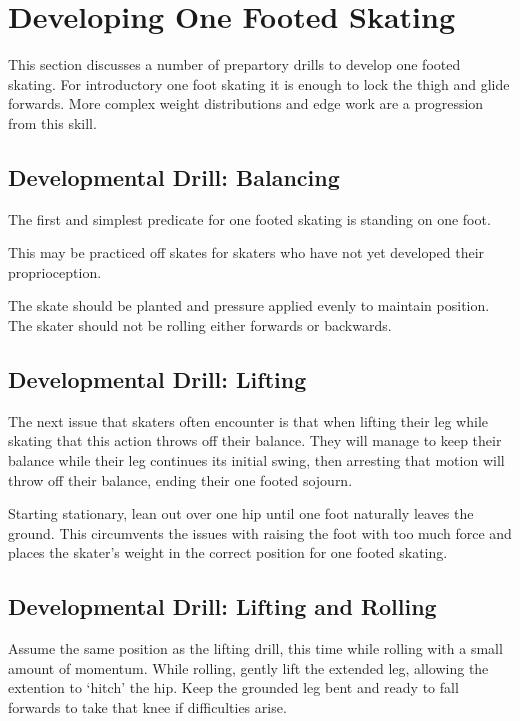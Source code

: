 \section{Developing One Footed Skating}
\label{sec:one_foot/development}


This section discusses a number of prepartory drills to develop one footed skating. 
For introductory one foot skating it is enough to lock the thigh and glide forwards.
More complex weight distributions and edge work are a progression from this skill.     


\subsection*{Developmental Drill: Balancing}
The first and simplest predicate for one footed skating is standing on one foot. 

This may be practiced off skates for skaters who have not yet developed their proprioception.    

The skate should be planted and pressure applied evenly to maintain position.   
The skater should not be rolling either forwards or backwards.

\subsection*{Developmental Drill: Lifting}
The next issue that skaters often encounter is that when lifting their leg while skating that this action throws off their balance.
They will manage to keep their balance while their leg continues its initial swing, then arresting that motion will throw off their balance, ending their one footed sojourn.  


Starting stationary, lean out over one hip until one foot naturally leaves the ground.
This circumvents the issues with raising the foot with too much force and places the skater's weight in the correct position for one footed skating.    


\subsection*{Developmental Drill: Lifting and Rolling}
 

Assume the same position as the lifting drill, this time while rolling with a small amount of momentum. 
While rolling, gently lift the extended leg, allowing the extention to `hitch' the hip.
Keep the grounded leg bent and ready to fall forwards to take that knee if difficulties arise.  


